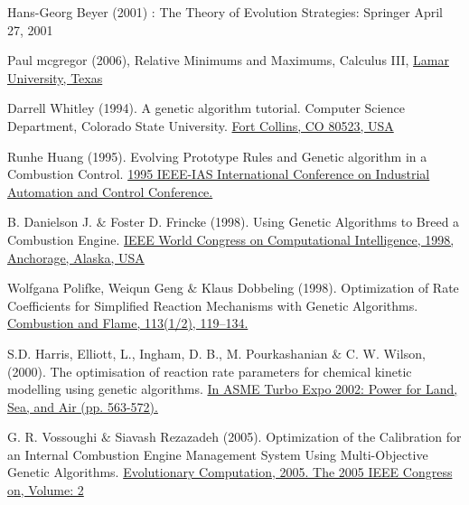 \documentclass[12pt]{article}
\numberwithin{equation}{section}
\begin{document}
\begin{flushleft}
\newpage

\begin{thebibliography}{9} 

 \label{c6}
Hans-Georg Beyer (2001) : The Theory of Evolution Strategies: Springer April 27, 2001


 \label{c_optima}
Paul mcgregor (2006), Relative Minimums and Maximums, Calculus III, 
\href{https://tutorial.math.lamar.edu/Classes/CalcIII/RelativeExtrema.aspx}{Lamar University, Texas}


 \label{c7}
Darrell Whitley (1994). A genetic algorithm tutorial. Computer Science Department, Colorado State University. \href{https://www.cs.colostate.edu/~genitor/MiscPubs/tutorial.pdf}{Fort Collins, CO 80523, USA}


 \label{ga0}
Runhe Huang (1995). Evolving Prototype Rules and Genetic algorithm
in a Combustion Control. \href{https://ieeexplore.ieee.org/document/465834?section=abstract}{1995 IEEE-IAS International Conference on Industrial Automation and Control Conference.}


 \label{ga1}
B. Danielson J. $\&$ Foster D. Frincke (1998). Using Genetic Algorithms to Breed a Combustion Engine. \href{https://ieeexplore.ieee.org/document/699722}{IEEE World Congress on Computational Intelligence, 1998, Anchorage, Alaska, USA}


 \label{ga2}
Wolfgana Polifke, Weiqun Geng $\&$ Klaus Dobbeling (1998). Optimization of Rate Coefficients for Simplified Reaction
Mechanisms with Genetic Algorithms. \href{https://www.sciencedirect.com/science/article/abs/pii/S0010218097002125}{Combustion and Flame, 113(1/2), 119–134.}


 \label{f11} 
S.D. Harris, Elliott, L., Ingham, D. B., M. Pourkashanian $\&$ C. W. Wilson, (2000). The optimisation of reaction rate parameters for chemical kinetic modelling using genetic algorithms. \href{https://asmedigitalcollection.asme.org/GT/proceedings-abstract/GT2002/36061/563/295726}{In ASME Turbo Expo 2002: Power for Land, Sea, and Air (pp. 563-572).}


 \label{ga8}
G. R. Vossoughi $\&$ Siavash Rezazadeh (2005). Optimization of the Calibration for an Internal Combustion Engine Management System Using Multi-Objective Genetic Algorithms. \href{https://www.researchgate.net/publication/4201526_Optimization_of_the_calibration_for_an_internal_combustion_engine_management_system_using_multi-objective_genetic_algorithms}{Evolutionary Computation, 2005. The 2005 IEEE Congress on, Volume: 2}



\end{thebibliography}
\end{flushleft}
\end{document}
